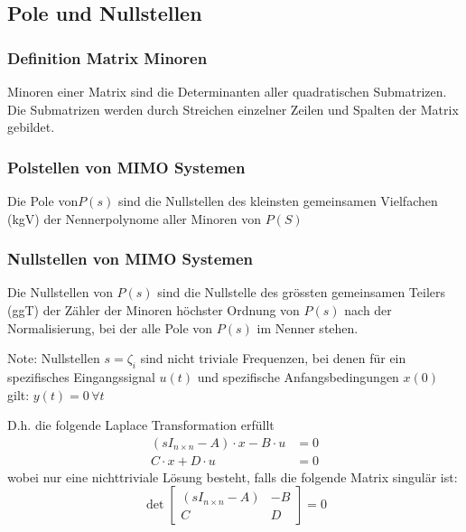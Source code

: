 \subsection{Pole und Nullstellen} 
\subsubsection{Definition Matrix Minoren}
        Minoren einer Matrix sind die Determinanten aller quadratischen Submatrizen. Die Submatrizen werden durch Streichen einzelner Zeilen und Spalten der Matrix gebildet.

    \subsubsection{Polstellen von MIMO Systemen}
        Die Pole von$P(s)$ sind die Nullstellen des kleinsten gemeinsamen Vielfachen (kgV) der Nennerpolynome aller Minoren von $P(S)$

    \subsubsection{Nullstellen von MIMO Systemen}
        Die Nullstellen von $P(s)$ sind die Nullstelle des grössten gemeinsamen Teilers (ggT) der Zähler der Minoren höchster Ordnung von $P(s)$ nach der Normalisierung, bei der alle Pole von $P(s)$ im Nenner stehen.
        
        Note: Nullstellen $s=\zeta_i$ sind nicht triviale Frequenzen, bei denen für ein spezifisches Eingangssignal $u(t)$ und spezifische Anfangsbedingungen $x(0)$ gilt: $y(t) = 0 \,\forall t$

        D.h. die folgende Laplace Transformation erfüllt
        \begin{align*}
            (sI_{n\times n} -A)\cdot x - B \cdot u &= 0\\
            C\cdot x + D \cdot u &= 0
        \end{align*}
        wobei nur eine nichttriviale Lösung besteht, falls die folgende Matrix singulär ist: 
        \begin{equation*}
            \det\begin{bmatrix}
                (sI_{n\times n}- A) & -B \\
                C& D
            \end{bmatrix} = 0
        \end{equation*}

